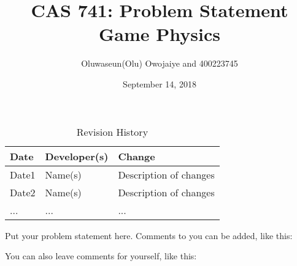 \documentclass{article}
\title{CAS 741: Problem Statement\\Game Physics}
\author{Oluwaseun(Olu) Owojaiye and 400223745}
\date{September 14, 2018}
\begin{document}
\maketitle

\begin{table}[hp]
\caption{Revision History} \label{TblRevisionHistory}
\begin{tabularx}{\textwidth}{llX}
\toprule
\textbf{Date} & \textbf{Developer(s)} & \textbf{Change}\\
\midrule
Date1 & Name(s) & Description of changes\\
Date2 & Name(s) & Description of changes\\
... & ... & ...\\
\bottomrule
\end{tabularx}
\end{table}

Put your problem statement here.  Comments to you can be added, like this:


You can also leave comments for yourself, like this:

\end{document}
